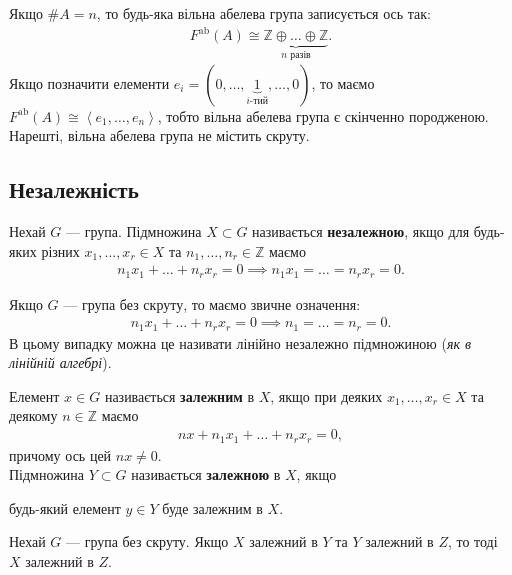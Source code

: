 \documentclass{math_library}
\begin{document}
\begin{corollary}
Якщо $\# A = n$, то будь-яка вільна абелева група записується ось так:
\begin{align*}
F^{\text{ab}}(A) \cong \underbrace{\mathbb{Z} \oplus \dots \oplus \mathbb{Z}}_{\text{$n$ разів}}.
\end{align*}
Якщо позначити елементи $e_i = (0,\dots,\underbrace{1}_{\text{$i$-тий}},\dots,0)$, то маємо $F^{\text{ab}}(A) \cong \left<e_1,\dots,e_n\right>$, тобто вільна абелева група є скінченно породженою. Нарешті, вільна абелева група не містить скруту.
\end{corollary}


\subsection{Незалежність}
\begin{definition}
Нехай $G$ --- група. Підмножина $X \subset G$ називається \textbf{незалежною}, якщо для будь-яких різних $x_1,\dots,x_r \in X$ та $n_1,\dots,n_r \in \mathbb{Z}$ маємо
\begin{align*}
n_1 x_1 + \dots + n_r x_r = 0 \implies n_1 x_1 = \dots = n_r x_r = 0.
\end{align*}
\end{definition}

\begin{remark}
Якщо $G$ --- група без скруту, то маємо звичне означення:
\begin{align*}
n_1 x_1 + \dots + n_r x_r = 0 \implies n_1 = \dots = n_r = 0.
\end{align*}
В цьому випадку можна це називати лінійно незалежно підмножиною (\textit{як в лінійній алгебрі}).
\end{remark}

\begin{definition}
Елемент $x \in G$ називається \textbf{залежним} в $X$, якщо при деяких $x_1,\dots,x_r \in X$ та деякому $n \in \mathbb{Z}$ маємо
\begin{align*}
nx + n_1 x_1 + \dots + n_r x_r =0,
\end{align*}
причому ось цей $nx \neq 0$.\\
Підмножина $Y \subset G$ називається \textbf{залежною} в $X$, якщо
\begin{center}
будь-який елемент $y \in Y$ буде залежним в $X$.
\end{center}
\end{definition}

\begin{remark}
Нехай $G$ --- група без скруту. Якщо $X$ залежний в $Y$ та $Y$ залежний в $Z$, то тоді $X$ залежний в $Z$. 
\end{remark}
\end{document}
